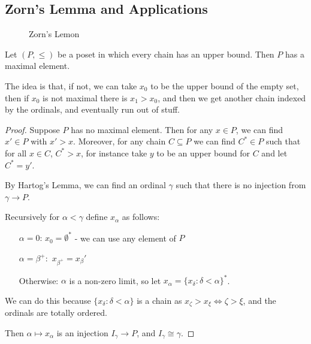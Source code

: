 \documentclass[10pt,a4paper]{article}
\begin{document}
\subsection{Zorn's Lemma and Applications}
\begin{figure}[H]
\centering
{}
\caption{Zorn's Lemon}
\end{figure}
\begin{theorem}
Let $(P, \leq)$ be a poset in which every chain has an upper bound. Then $P$ has a maximal element.
\end{theorem}
The idea is that, if not, we can take $x_0$ to be the upper bound of the empty set, then if $x_0$ is not maximal there is $x_1 > x_0$, and then we get another chain indexed by the ordinals, and eventually run out of stuff.
\begin{proof}
Suppose $P$ has no maximal element. Then for any $x \in P$, we can find $x' \in P$ with $x' > x$. Moreover, for any chain $C \subseteq P$ we can find $C^{\ast} \in P$ such that for all $x \in C$, $C^{\ast} > x$, for instance take $y$ to be an upper bound for $C$ and let $C^{\ast} = y'$.

By Hartog's Lemma, we can find an ordinal $\gamma$ such that there is no injection from $\gamma \to P$.

Recursively for $\alpha < \gamma$ define $x_{\alpha}$ as follows:
\begin{itemize}
\item[$\alpha=0$:] $x_0 = \emptyset^{\ast}$ - we can use any element of $P$
\item[$\alpha=\beta^+:$] $x_{\beta^+} = x_{\beta}'$
\item[Otherwise:] $\alpha$ is a non-zero limit, so let $x_{\alpha} = \{x_{\delta} : \delta < \alpha\}^{\ast}$.
\end{itemize}
We can do this because $\{x_\delta : \delta < \alpha\}$ is a chain as $x_{\zeta} > x_{\xi} \iff \zeta > \xi$, and the ordinals are totally ordered.

Then $\alpha \mapsto x_{\alpha}$ is an injection $I_\gamma \to P$, and $I_\gamma \cong \gamma$. \contr
\end{proof}
\end{document}

